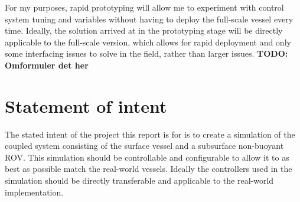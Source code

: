 For my purposes, rapid prototyping will allow me to experiment with control system tuning and variables without having to deploy the full-scale vessel every time. Ideally, the solution arrived at in the prototyping stage will be directly applicable to the full-scale version, which allows for rapid deployment and only some interfacing issues to solve in the field, rather than larger issues. \textbf{TODO: Omformuler det her}

\section{Statement of intent}
The stated intent of the project this report is for is to create a simulation of the coupled system consisting of the surface vessel and a subsurface non-buoyant ROV. This simulation should be controllable and configurable to allow it to as best as possible match the real-world vessels. Ideally the controllers used in the simulation should be directly transferable and applicable to the real-world implementation.
